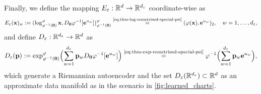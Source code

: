     Finally, we define the mapping $E_\varepsilon:\mathbb{R}^d \to \mathbb{R}^{d_\varepsilon}$ coordinate-wise as
\begin{equation}
    E_\varepsilon(\mathbf{x})_w := (\log^\varphi_{\varphi^{-1}(\mathbf{0})} \mathbf{x}, D_{\mathbf{0}}\varphi^{-1}[\mathbf{e}^{u_w}])^\varphi_{\varphi^{-1}(\mathbf{0})} \overset{\text{\ref{eq:thm-log-remetrised-special-psi}}}{=} (\varphi(\mathbf{x}), \mathbf{e}^{u_w})_2, \quad w = 1, \ldots, d_\varepsilon,
    \label{eq:rae-encoder}
\end{equation}
and define $D_\varepsilon:\mathbb{R}^{d_\varepsilon} \to \mathbb{R}^d$ as
\begin{equation}
    D_\varepsilon(\mathbf{p}):= \exp_{\varphi^{-1}(\mathbf{0})}^\varphi \Bigl( \sum_{w=1}^{d_\varepsilon} \mathbf{p}_w D_{\mathbf{0}}\varphi^{-1}[\mathbf{e}^{u_w}]\Bigr) \overset{\text{\ref{eq:thm-exp-remetrised-special-psi}}}{=} \varphi^{-1} \Bigl( \sum_{w=1}^{d_\varepsilon} \mathbf{p}_w \mathbf{e}^{u_w} \Bigr),
    \label{eq:rae-decoder}
\end{equation}
which generate a Riemannian autoencoder and the set $D_\varepsilon(\mathbb{R}^{d_\varepsilon}) \subset \mathbb{R}^d$ as an approximate data manifold as in the scenario in \ref{fig:learned_charts}.

